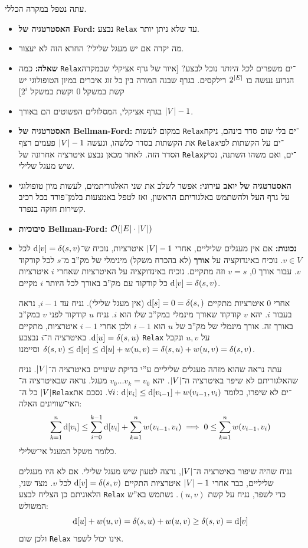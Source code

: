 \documentclass[]{../../../../tex/classes/styledArticle}
\begin{document}
	עתה נטפל במקרה הכללי. 
	\begin{itemize}
		\item \textbf{האסטרטגיה של Ford: }נבצע \texttt{Relax} עד שלא ניתן יותר. 
		\item מה יקרה אם יש מעגל שלילי? החרא הזה לא יעצור. 
		\item \textbf{שאלה: }כמה \texttt{Relax}־ים משפרים \textit{לכל היותר} נוכל לבצע? [איור של גרף אציקלי שבמקרה הגרוע נעשה בו $2^{\left \lvert E \right \rvert}$ רילקסים. בגרף שבנה המורה בין כל זוג איברים במיון הטופולוגי יש קשת במשקל $0$ וקשת במשקל $2^{i}$]
		\item בגרף אציקלי, המסלולים הפשוטים הם באורך $\left \lvert V \right \rvert - 1$. 
		\item \textbf{האסטרטגיה של Bellman-Ford: }במקום לעשות \texttt{Relax}־ים בלי שום סדר בינהם, ניקח את הקשתות בסדר כלשהו, ונעשה $\left \lvert V \right \rvert - 1$ פעמים רצף \texttt{Relax}־ים על הקשתות לפי הסדר הזה. לאחר מכאן נבצע איטרציה אחרונה של \texttt{Relax}־ים, ואם משהו השתנה, נסיק שיש מעגל שלילי. 
		\item \textbf{האסטרטגיה של יואב עירוני: }אפשר לשלב את שני האלגוריתמים, לעשות מיון טופולוגי על גרף העל ולהשתמש באלגוריתם הראשון, ואז לטפל באמצעות בלמן־פורד בכל רכיב קשירות חזקה בנפרד. 
		\item \textbf{סיבוכיות Bellman-Ford: }$\mathcal{O}(\left \lvert E \right \rvert \cdot \left \lvert V \right \rvert)$
		\item \textbf{נכונות: }אם אין מעגלים שליליים, אחרי $\left \lvert V \right \rvert - 1$ איטרציות, נוכיח ש־$\mathrm{d}[v] = \delta(s, v)$ לכל $v \in V$. נוכיח באינדוקציה על \textbf{אורך} (לא בהכרח משקל) מינימלי של מק''ב מ־$s$ לכל קודקוד $v$. עבור אורך $0$, $v = s$ וזה מתקיים. נוכיח באינדוקציה על האיטרציות שאחרי $i$ איטרציות כל קודקוד עם מק''ב באורך לכל היותר $i$ מקיים $\mathrm{d}[v] = \delta(s, v)$. 
		
		אחרי $0$ איטרציות מתקיים $\mathrm{d}[s] = 0 = \delta(s, )$ (אין מעגל שלילי). נניח עד $i -1$, נראה בעבור $i$. יהא $v$ קודקוד שאורך מינמלי במק''ב שלו הוא $i$. נניח $u$ קודקוד לפני $v$ במק''ב באורך זה. אורך מינמלי של מק''ב של $u$ הוא $i -1$ ולכן אחרי $i - 1$ איטרציות, מתקיים $\mathrm{d}[u] = \delta(s, u)$. באיטרציה ה־$i$ נבצבע \texttt{Relax} על $u, v$ ונקבל $\delta(s, v) \le \mathrm{d}[v] \le \mathrm{d}[u] + w(u, v) = \delta(s, u) + w(u, v) = \delta(s, v)$ וסיימנו. 
		
		עתה נראה שהוא מזהה מעגלים שליליים ע''י בדיקת שינויים באיטרציה ה־$\left \lvert V \right \rvert$. נניח שהאלגוריתם לא שיפר באיטרציה ה־$\left \lvert V \right \rvert$. יהא $v_0 \dots v_k = v_0$ מעגל. נראה שבאיטרציה ה־$\left \lvert V \right \rvert$ כל ה־\texttt{Relax}־ים לא שיפרו, כלומר $\forall i \colon \mathrm{d}[v_i] \le \mathrm{d}[v_{i - 1}] + w(v_{i - 1}, v_i)$. נסכם את האי־שוויונים האלה: 
		\[ \sum_{k = 1}^{n} \mathrm{d}[v_i] \le \sum_{i = 0}^{k - 1}\mathrm{d}[v_i] + \sum_{k = 1}^{n} w(v_{i -1}, v_i) \implies 0 \le \sum_{k = 1}^{n} w(v_{i - 1}, v_i) \]
		כלומר משקל המעגל אי־שלילי. 
		
		נניח שהיה שיפור באיטרציה ה־$\left \lvert V \right \rvert$, נרצה לטעון שיש מעגל שלילי. אם לא היו מעגלים שליליים, כבר אחרי $\left \lvert V \right \rvert - 1$ איטרציות התקיים $\mathrm{d}[v] = \delta(s, v)$ לכל $v$. מצד שני, הלאוגיתם כן הצליח לבצע \texttt{Relax} כדי לשפר, נניח על קשת $(u, v)$. נשתמש בא''ש המשולש: 
		\[ \mathrm{d}[u] + w(u, v) = \delta(s, u) + w(u, v) \ge \delta(s, v) = \mathrm{d}[v] \]
		ולכן שום \texttt{Relax} אינו יכול לשפר. 
	\end{itemize}
	
\end{document}
